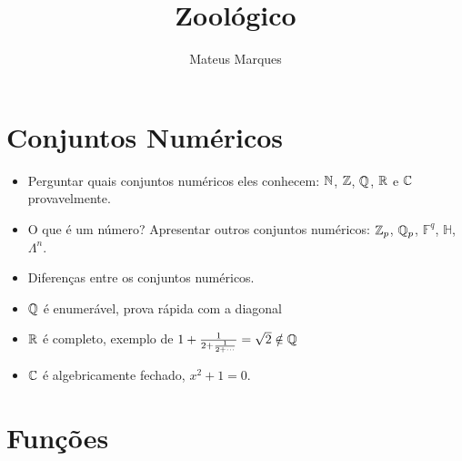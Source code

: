 \documentclass[a4paper,fleqn,12pt]{article}
\title{\Huge{\textbf{Zoológico}}}
\author{Mateus Marques}
\begin{document}
\maketitle


\section{Conjuntos Numéricos}

\begin{itemize}
\item Perguntar quais conjuntos numéricos eles conhecem: $\mathbb{N}$, $\mathbb{Z}$, $\mathbb{Q}$, $\mathbb{R}$ e $\mathbb{C}$ provavelmente.
\item O que é um número? Apresentar outros conjuntos numéricos: $\mathbb{Z}_p$, $\mathbb{Q}_p$, $\mathbb{F}^q$, $\mathbb{H}$, $\Lambda^n$.
\item Diferenças entre os conjuntos numéricos.
\item $\mathbb{Q}$ é enumerável, prova rápida com a diagonal
\item $\mathbb{R}$ é completo, exemplo de $1 + \frac{1}{2 + \frac{1}{2 + \cdots}} = \sqrt{2} \notin \mathbb{Q}$
\item $\mathbb{C}$ é algebricamente fechado, $x^2 + 1 = 0$.
\end{itemize}


\section{Funções}
\end{document}
